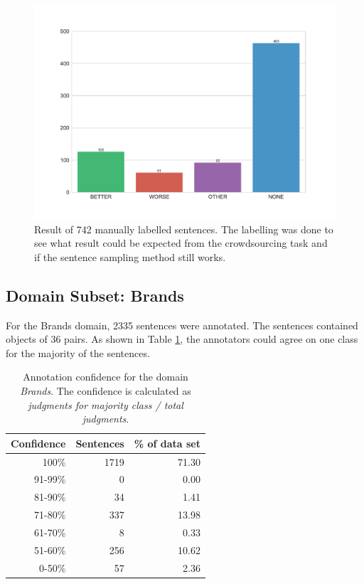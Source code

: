 \begin{figure}[h]
\centering
\caption{Result of 742 manually labelled sentences. The labelling was done to see what result could be expected from the crowdsourcing task and if the sentence sampling method still works.}
\label{fig:sample}
\includegraphics[width=1\linewidth]{images/dataset/pre-dist}
\end{figure}
\FloatBarrier
\subsection{Domain Subset: Brands}
\label{sec:brands}

For the Brands domain, 2335 sentences were annotated. The sentences contained objects of 36 pairs. As shown in Table \ref{fig:brand_agg}, the annotators could agree on one class for the majority of the sentences.


\begin{table}[h]
\caption{Annotation confidence for the domain \emph{Brands}. The confidence is calculated as \emph{judgments for majority class / total judgments}.}
\label{fig:brand_agg}
\centering
\begin{tabular}{@{}rrr@{}}
\toprule
Confidence & Sentences & \% of data set \\
\midrule
100\%	&	1719	&	71.30	 \\ 
91-99\%	&	0	&	0.00	 \\ 
81-90\%	&	34	&	1.41	 \\ 
71-80\%	&	337	&	13.98	 \\ 
61-70\%	&	8	&	0.33	 \\ 
51-60\%	&	256	&	10.62	 \\ 
0-50\%	&	57	&	2.36	 \\ 
\bottomrule
\end{tabular}
\end{table}



